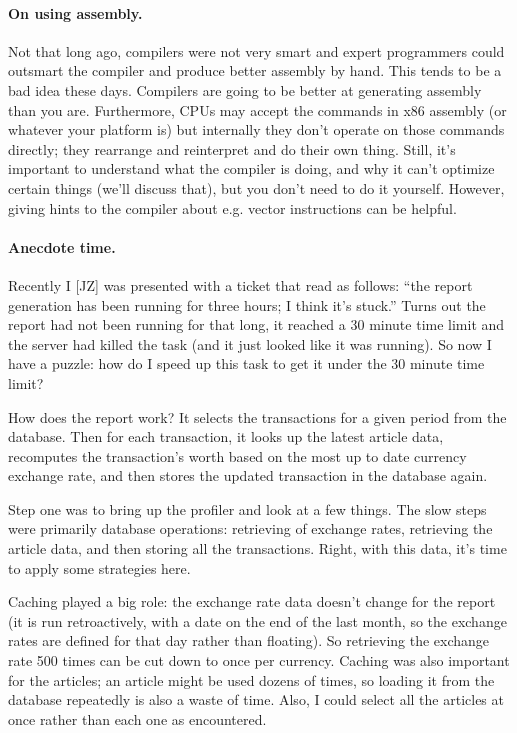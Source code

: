 \paragraph{On using assembly.} Not that long ago, compilers were not very smart and expert programmers could outsmart the compiler and produce better assembly by hand. This tends to be a bad idea these days. Compilers are going to be better at generating assembly than you are. Furthermore, CPUs may accept the commands in x86 assembly (or whatever your platform is) but internally they don't operate on those commands directly; they rearrange and reinterpret and do their own thing. Still, it's important to understand what the compiler is doing, and why it can't optimize certain things (we'll discuss that), but you don't need to do it yourself. However, giving hints to the compiler about e.g. vector instructions can be helpful.

\paragraph{Anecdote time.} Recently I [JZ] was presented with a ticket that read as follows: ``the report generation has been running for three hours; I think it's stuck.'' Turns out the report had not been running for that long, it reached a 30 minute time limit and the server had killed the task (and it just looked like it was running). So now I have a puzzle: how do I speed up this task to get it under the 30 minute time limit?

How does the report work? It selects the transactions for a given period from the database. Then for each transaction, it looks up the latest article data, recomputes the transaction's worth based on the most up to date currency exchange rate, and then stores the updated transaction in the database again.

Step one was to bring up the profiler and look at a few things. The slow steps were primarily database operations: retrieving of exchange rates, retrieving the article data, and then storing all the transactions. Right, with this data, it's time to apply some strategies here.

Caching played a big role: the exchange rate data doesn't change for the report (it is run retroactively, with a date on the end of the last month, so the exchange rates are defined for that day rather than floating). So retrieving the exchange rate 500 times can be cut down to once per currency. Caching was also important for the articles; an article might be used dozens of times, so loading it from the database repeatedly is also a waste of time. Also, I could select all the articles at once rather than each one as encountered.

